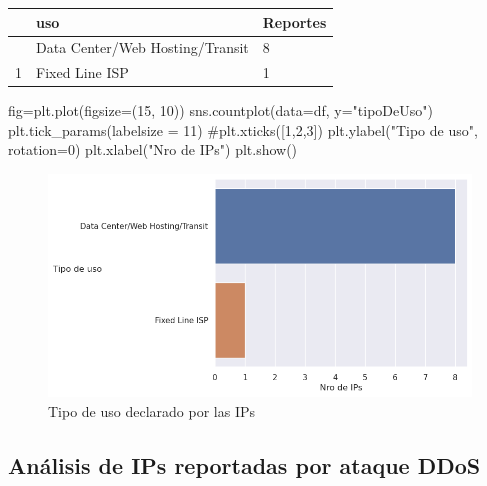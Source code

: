 \documentclass[
  letterpaper,
  DIV=11,
  numbers=noendperiod]{scrartcl}
\newenvironment{Shaded}{\begin{snugshade}}{\end{snugshade}}
\newcommand{\CommentTok}[1]{\textcolor[rgb]{0.37,0.37,0.37}{#1}}
\newcommand{\DecValTok}[1]{\textcolor[rgb]{0.68,0.00,0.00}{#1}}
\newcommand{\NormalTok}[1]{\textcolor[rgb]{0.00,0.23,0.31}{#1}}
\newcommand{\OperatorTok}[1]{\textcolor[rgb]{0.37,0.37,0.37}{#1}}
\newcommand{\StringTok}[1]{\textcolor[rgb]{0.13,0.47,0.30}{#1}}
\begin{document}
\begin{longtable}[]{@{}lll@{}}
\toprule\noalign{}
& uso & Reportes \\
\midrule\noalign{}
\endhead
\bottomrule\noalign{}
\endlastfoot
0 & Data Center/Web Hosting/Transit & 8 \\
1 & Fixed Line ISP & 1 \\
\end{longtable}

\begin{Shaded}
\begin{Highlighting}[]
\NormalTok{fig}\OperatorTok{=}\NormalTok{plt.plot(figsize}\OperatorTok{=}\NormalTok{(}\DecValTok{15}\NormalTok{, }\DecValTok{10}\NormalTok{))}
\NormalTok{sns.countplot(data}\OperatorTok{=}\NormalTok{df, y}\OperatorTok{=}\StringTok{"tipoDeUso"}\NormalTok{)}
\NormalTok{plt.tick\_params(labelsize }\OperatorTok{=} \DecValTok{11}\NormalTok{)}
\CommentTok{\#plt.xticks([1,2,3])}
\NormalTok{plt.ylabel(}\StringTok{"Tipo de uso"}\NormalTok{, rotation}\OperatorTok{=}\DecValTok{0}\NormalTok{)}
\NormalTok{plt.xlabel(}\StringTok{"Nro de IPs"}\NormalTok{)}
\NormalTok{plt.show()}
\end{Highlighting}
\end{Shaded}

\begin{figure}[H]

{\centering \includegraphics{Análisis_files/figure-pdf/fig-tipodeusossh-output-1.png}

}

\caption{\label{fig-tipodeusossh}Tipo de uso declarado por las IPs}

\end{figure}

\hypertarget{anuxe1lisis-de-ips-reportadas-por-ataque-ddos}{%
\subsection{Análisis de IPs reportadas por ataque
DDoS}\label{anuxe1lisis-de-ips-reportadas-por-ataque-ddos}}
\end{document}
